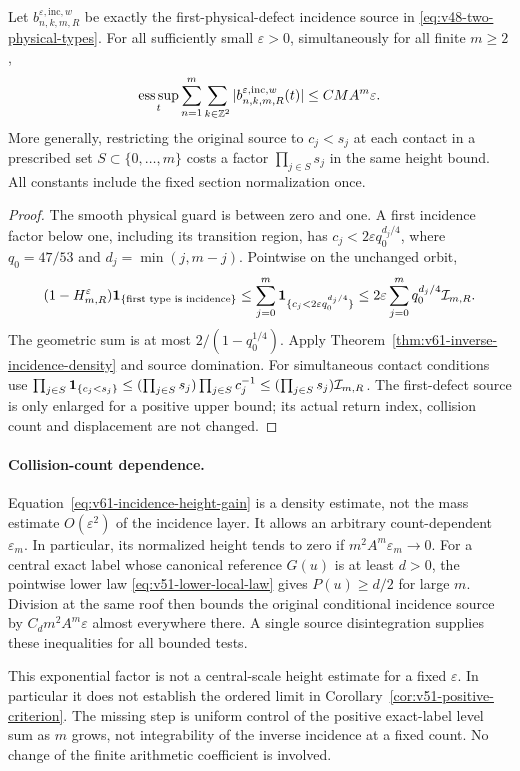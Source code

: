 \begin{corollary}
\label{cor:v61-incidence-height-gain}
Let $b^{\varepsilon,\mathrm{inc},w}_{n,k,m,R}$ be exactly the
first-physical-defect incidence source in
\eqref{eq:v48-two-physical-types}. For all sufficiently small
$\varepsilon>0$, simultaneously for all finite $m\ge2$,
\begin{equation}\label{eq:v61-incidence-height-gain}
 \operatorname*{ess\,sup}_t\sum_{n=1}^{m}\sum_{k\in\Z^2}
 |b^{\varepsilon,\mathrm{inc},w}_{n,k,m,R}(t)|
                 \le C M A^m\varepsilon.
\end{equation}
More generally, restricting the original source to
$c_j<s_j$ at each contact in a prescribed set $S\subset\{0,\ldots,m\}$
costs a factor $\prod_{j\in S}s_j$ in the same height bound.
All constants include the fixed section normalization once.
\end{corollary}
\begin{proof}
The smooth physical guard is between zero and one. A first incidence
factor below one, including its transition region, has
$c_j<2\varepsilon q_0^{d_j/4}$, where
$q_0=47/53$ and $d_j=\min(j,m-j)$. Pointwise on the unchanged orbit,
\[
 (1-H_{m,R}^{\varepsilon})\mathbf1_{\{\text{first type is incidence}\}}
 \le\sum_{j=0}^{m}\mathbf1_{\{c_j<2\varepsilon q_0^{d_j/4}\}}
 \le2\varepsilon\sum_{j=0}^{m}q_0^{d_j/4}\mathcal I_{m,R}.
\]
The geometric sum is at most $2/(1-q_0^{1/4})$. Apply
Theorem~\ref{thm:v61-inverse-incidence-density} and source domination.
For simultaneous contact conditions use
$\prod_{j\in S}\mathbf1_{\{c_j<s_j\}}
 \le(\prod_{j\in S}s_j)\prod_{j\in S}c_j^{-1}
 \le(\prod_{j\in S}s_j)\mathcal I_{m,R}$.
The first-defect source is only enlarged for a positive upper bound;
its actual return index, collision count and displacement are not changed.
\end{proof}

\paragraph{Collision-count dependence.}
Equation~\eqref{eq:v61-incidence-height-gain} is a density estimate,
not the mass estimate $O(\varepsilon^2)$ of the incidence layer.
It allows an arbitrary count-dependent $\varepsilon_m$. In particular,
its normalized height tends to zero if
$m^2A^m\varepsilon_m\to0$. For a central exact label whose canonical
reference $G(u)$ is at least $d>0$, the pointwise lower law
\eqref{eq:v51-lower-local-law} gives $P(u)\ge d/2$ for large $m$.
Division at the same roof then bounds the original conditional incidence
source by $C_d m^2A^m\varepsilon$ almost everywhere there. A single
source disintegration supplies these inequalities for all bounded tests.

This exponential factor is not a central-scale height estimate for a
fixed $\varepsilon$. In particular it does not establish the ordered
limit in Corollary~\ref{cor:v51-positive-criterion}. The missing step
is uniform control of the positive exact-label level sum as $m$ grows,
not integrability of the inverse incidence at a fixed count. No change
of the finite arithmetic coefficient is involved.
